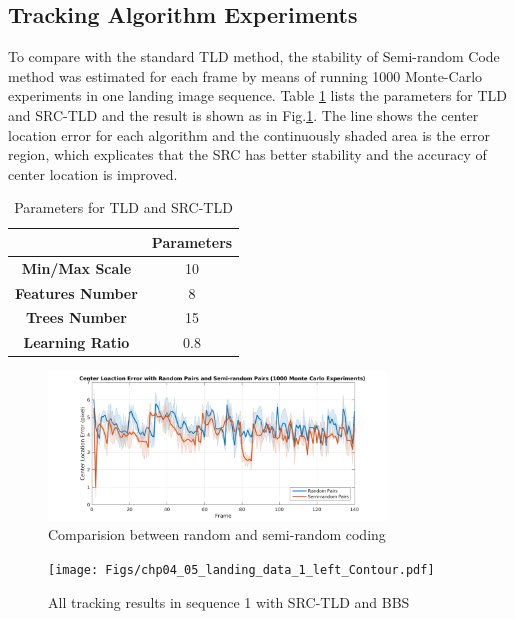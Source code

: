 \subsection{Tracking Algorithm Experiments}
To compare with the standard TLD method, the stability of Semi-random Code method was estimated for each frame by means of running 1000 Monte-Carlo experiments in one landing image sequence. Table \ref{lab:TLD_params} lists the parameters for TLD and SRC-TLD and the result is shown as in Fig.\ref{fig:chp04_24_random_semi_random_monte_carlo}. The line shows the center location error for each algorithm and the continuously shaded area is the error region, which explicates that the SRC has better stability and the accuracy of center location is improved. 

\begin{table}[!th]
	\centering
	\caption{Parameters for TLD and SRC-TLD}
	\label{lab:TLD_params}
	\begin{tabular}{cc}
		\hline
		& \textbf{Parameters} \\ \hline
		\textbf{Min/Max Scale} & 10 \\
		\textbf{Features Number} & 8 \\
		\textbf{Trees Number} & 15 \\
		\textbf{Learning Ratio} & 0.8 \\ \hline
	\end{tabular}
\end{table}

\begin{figure}[!th]
	\centering
	\includegraphics[width=0.8\textwidth]{Figs/chp04_24_random_semi_random_monte_carlo.pdf}
	\caption{Comparision between random and semi-random coding}
	\label{fig:chp04_24_random_semi_random_monte_carlo}    
\end{figure}

\begin{figure}[!th]
	\centering
	\texttt{[image: Figs/chp04\_05\_landing\_data\_1\_left\_Contour.pdf]}
	\caption{All tracking results in sequence 1 with SRC-TLD and BBS}
	\label{fig:chp04_05_landing_data_1_left_Contour}    
\end{figure}

